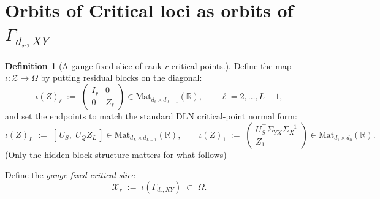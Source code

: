 \documentclass{article}
\newcommand{\R}{\mathbb{R}}
\newcommand{\Mat}{\mathrm{Mat}}
\theoremstyle{definition}
\newtheorem{definition}[theorem]{Definition}
\begin{document}
\section{Orbits of Critical loci as orbits of $\Gamma_{d_r,XY}$}
\begin{definition}[A gauge-fixed slice of rank-$r$ critical points.]
    Define the map $\iota:\mathcal Z\to \Omega$ by putting residual blocks on the diagonal:
\begin{equation}\label{eq:iota-Z}
\iota(Z)_\ell \;:=\;
\begin{pmatrix}
I_r & 0\\
0 & Z_\ell
\end{pmatrix}
\in \Mat_{d_\ell\times d_{\ell-1}}(\R),
\qquad \ell=2,\dots,L-1,
\end{equation}
and set the endpoints to match the standard DLN critical-point normal form:
\begin{equation}\label{eq:endpoints-slice}
\iota(Z)_L \;:=\; [\,U_S,\; U_Q Z_L\,]\in \Mat_{d_L\times d_{L-1}}(\R),
\qquad
\iota(Z)_1 \;:=\;
\begin{pmatrix}
U_S^\top \Sigma_{YX}\Sigma_X^{-1}\\
Z_1
\end{pmatrix}
\in \Mat_{d_1\times d_0}(\R).
\end{equation}
(Only the hidden block structure matters for what follows)
\end{definition}
\noindent
Define the \emph{gauge-fixed critical slice}
\begin{equation}\label{eq:Scrit-def}
 \mathcal{X}_{r} \;:=\; \iota(\Gamma_{d_r,XY}) \;\subset\; \Omega .
\end{equation}
\end{document}
